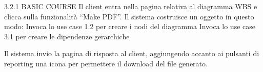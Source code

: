 
3.2.1 BASIC COURSE
Il client entra nella pagina relativa al diagramma WBS e clicca sulla funzionalità “Make PDF”.
Il sistema costruisce un oggetto in questo modo:
Invoca lo use case 1.2 per creare i nodi del diagramma
Invoca lo use case 3.1 per creare le dipendenze gerarchiche

Il sistema invio la pagina di risposta al client, aggiungendo accanto ai pulsanti di reporting
una icona per permettere il download del file generato.
